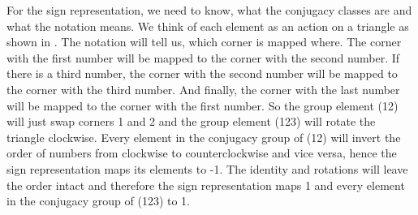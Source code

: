 For the sign representation, we need to know, what the conjugacy classes are and what the notation means.
We think of each element as an action on a triangle as shown in .
The notation will tell us, which corner is mapped where.
The corner with the first number will be mapped to the corner with the second number.
If there is a third number, the corner with the second number will be mapped to the corner with the third number.
And finally, the corner with the last number will be mapped to the corner with the first number.
So the group element (12) will just swap corners 1 and 2 and the group element (123) will rotate the triangle clockwise.
Every element in the conjugacy group of (12) will invert the order of numbers from clockwise to counterclockwise and vice versa, hence the sign representation maps its elements to -1.
The identity and rotations will leave the order intact and therefore the sign representation maps 1 and every element in the conjugacy group of (123) to 1.

